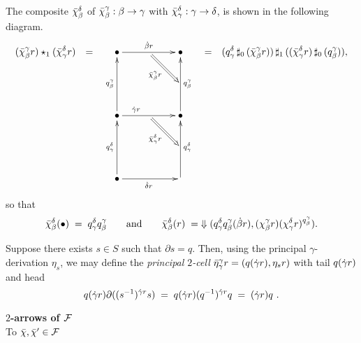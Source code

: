 \medskip
The composite $\bar{\chi}_{\beta}^{\delta}$ 
of $\bar{\chi}_{\beta}^{\gamma} : \beta \to \gamma$ 
with $\bar{\chi}_{\gamma}^{\delta} : \gamma  \to \delta$, 
is shown in the following diagram.
$$
{(\barch_{\beta}^{\gamma} r) \star_1 (\barch_{\gamma}^{\delta} r)}
{\quad=\quad}
{\xy
\xymatrix{
  \bullet \ar[rr]^{\db r} 
    & \ar @{=>} [dr]_{\barch_{\beta}^{\gamma} r}
      & \bullet \\
    & & \\
  \bullet \ar[uu]^{q_{\beta}^{\gamma}} 
          \ar[rr]^(0.3){\dg r} 
    & \ar @{=>} [dr]_{\barch_{\gamma}^{\delta} r} 
      & \bullet \ar[uu]_{q_{\beta}^{\gamma}} \\
    & & \\
  \bullet \ar[uu]^{q_{\gamma}^{\delta}} \ar[rr]_{\dd r} 
    & & \ar[uu]_{q_{\gamma}^{\delta}} \\
}
\endxy}
{\quad=\quad} 
{(q_{\gamma}^{\delta} \sharpz (\barch_{\beta}^{\gamma} r)) 
\sharpo
((\barch_{\gamma}^{\delta} r) \sharpz (q_{\beta}^{\gamma})),} 
$$
so that
$$
\bar{\chi}_{\beta}^{\delta}(\bullet) \;=\; q_{\gamma}^{\delta}q_{\beta}^{\gamma}
\qquad\mbox{and}\qquad
\bar{\chi}_{\beta}^{\delta}(r) \;=\; \Downarrow 
(q_{\gamma}^{\delta}q_{\beta}^{\gamma}(\dot{\beta} r), 
 (\chi_{\beta}^{\gamma}r)(\chi_{\gamma}^{\delta}r)^{q_{\beta}^{\gamma}}).
$$


\medskip
Suppose there exists $s \in S$ such that $\partial s = q$. 
Then, using the principal $\gamma$-derivation $\eta_s$, 
we may define the \emph{principal $2$-cell} 
$\bar{\eta}_{\gamma}^{\gamma} r = (q(\dot{\gamma} r),\eta_s r)$ 
with tail $q(\dot{\gamma} r)$ and head 
$$
q(\dot{\gamma} r) \partial((s^{-1})^{\dot{\gamma} r}s)
 \;=\; q(\dot{\gamma} r)(q^{-1})^{\dot{\gamma} r}q 
 \;=\; (\dot{\gamma} r)q~.
$$


\bigskip\noindent
{\large{\bf $2$-arrows of $\mathcal{F}$}}\\
To $\bar{\chi},\bar{\chi}' \in \mathcal{F}$

